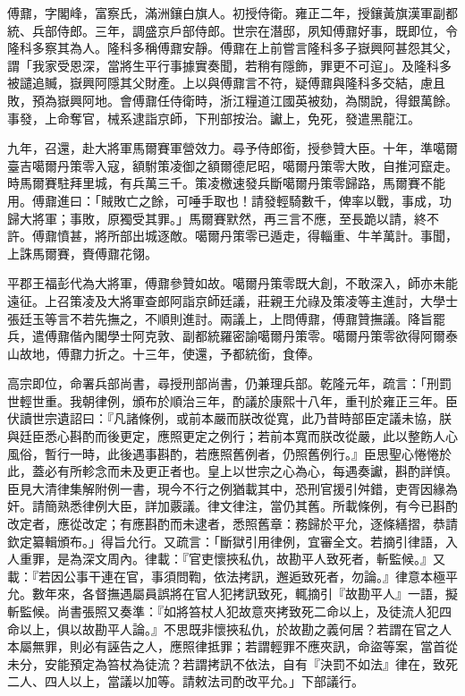 \begin{pinyinscope}
傅鼐，字閣峰，富察氏，滿洲鑲白旗人。初授侍衛。雍正二年，授鑲黃旗漢軍副都統、兵部侍郎。三年，調盛京戶部侍郎。世宗在潛邸，夙知傅鼐好事，既即位，令隆科多察其為人。隆科多稱傅鼐安靜。傅鼐在上前嘗言隆科多子嶽興阿甚怨其父，謂「我家受恩深，當將生平行事據實奏聞，若稍有隱飾，罪更不可逭」。及隆科多被譴追贓，嶽興阿隱其父財產。上以與傅鼐言不符，疑傅鼐與隆科多交結，慮且敗，預為嶽興阿地。會傅鼐任侍衛時，浙江糧道江國英被劾，為關說，得銀萬餘。事發，上命奪官，械系逮詣京師，下刑部按治。讞上，免死，發遣黑龍江。

九年，召還，赴大將軍馬爾賽軍營效力。尋予侍郎銜，授參贊大臣。十年，準噶爾臺吉噶爾丹策零入寇，額駙策凌御之額爾德尼昭，噶爾丹策零大敗，自推河竄走。時馬爾賽駐拜里城，有兵萬三千。策凌檄速發兵斷噶爾丹策零歸路，馬爾賽不能用。傅鼐進曰：「賊敗亡之餘，可唾手取也！請發輕騎數千，俾率以戰，事成，功歸大將軍；事敗，原獨受其罪。」馬爾賽默然，再三言不應，至長跪以請，終不許。傅鼐憤甚，將所部出城逐敵。噶爾丹策零已遁走，得輜重、牛羊萬計。事聞，上誅馬爾賽，賚傅鼐花翎。

平郡王福彭代為大將軍，傅鼐參贊如故。噶爾丹策零既大創，不敢深入，師亦未能遠征。上召策凌及大將軍查郎阿詣京師廷議，莊親王允祿及策凌等主進討，大學士張廷玉等言不若先撫之，不順則進討。兩議上，上問傅鼐，傅鼐贊撫議。降旨罷兵，遣傅鼐偕內閣學士阿克敦、副都統羅密諭噶爾丹策零。噶爾丹策零欲得阿爾泰山故地，傅鼐力折之。十三年，使還，予都統銜，食俸。

高宗即位，命署兵部尚書，尋授刑部尚書，仍兼理兵部。乾隆元年，疏言：「刑罰世輕世重。我朝律例，頒布於順治三年，酌議於康熙十八年，重刊於雍正三年。臣伏讀世宗遺詔曰：『凡諸條例，或前本嚴而朕改從寬，此乃昔時部臣定議未協，朕與廷臣悉心斟酌而後更定，應照更定之例行；若前本寬而朕改從嚴，此以整飭人心風俗，暫行一時，此後遇事斟酌，若應照舊例者，仍照舊例行。』臣思聖心惓惓於此，蓋必有所軫念而未及更正者也。皇上以世宗之心為心，每遇奏讞，斟酌詳慎。臣見大清律集解附例一書，現今不行之例猶載其中，恐刑官援引舛錯，吏胥因緣為奸。請簡熟悉律例大臣，詳加覈議。律文律注，當仍其舊。所載條例，有今已斟酌改定者，應從改定；有應斟酌而未逮者，悉照舊章：務歸於平允，逐條繕摺，恭請欽定纂輯頒布。」得旨允行。又疏言：「斷獄引用律例，宜審全文。若摘引律語，入人重罪，是為深文周內。律載：『官吏懷挾私仇，故勘平人致死者，斬監候。』又載：『若因公事干連在官，事須問鞫，依法拷訊，邂逅致死者，勿論。』律意本極平允。數年來，各督撫遇屬員誤將在官人犯拷訊致死，輒摘引『故勘平人』一語，擬斬監候。尚書張照又奏準：『如將笞杖人犯故意夾拷致死二命以上，及徒流人犯四命以上，俱以故勘平人論。』不思既非懷挾私仇，於故勘之義何居？若謂在官之人本屬無罪，則必有誣告之人，應照律抵罪；若謂輕罪不應夾訊，命盜等案，當首從未分，安能預定為笞杖為徒流？若謂拷訊不依法，自有『決罰不如法』律在，致死二人、四人以上，當議以加等。請敕法司酌改平允。」下部議行。


\end{pinyinscope}
